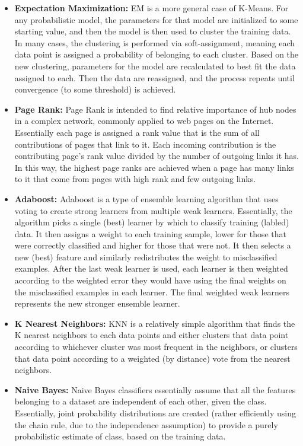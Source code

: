 \documentclass[fleqn,10pt]{SelfArx} %
\begin{document}
\begin{itemize}
	\item{\textbf{Expectation Maximization:}} EM is a more general case of K-Means.  For any probabilistic model, the parameters for that model are initialized to some starting value, and then the model is then used to cluster the training data.  In many cases, the clustering is performed via soft-assignment, meaning each data point is assigned a probability of belonging to each cluster.  Based on the new clustering, parameters for the model are recalculated to best fit the data assigned to each.  Then the data are reassigned, and the process repeats until convergence (to some threshold) is achieved.
	\item{\textbf{Page Rank:}} Page Rank is intended to find relative importance of hub nodes in a complex network, commonly applied to web pages on the Internet.  Essentially each page is assigned a rank value that is the sum of all contributions of pages that link to it.  Each incoming contribution is the contributing page's rank value divided by the number of outgoing links it has.  In this way, the highest page ranks are achieved when a page has many links to it that come from pages with high rank and few outgoing links.
	\item{\textbf{Adaboost:}} Adaboost is a type of ensemble learning algorithm that uses voting to create strong learners from multiple weak learners.  Essentially, the algorithm picks a single (best) learner by which to classify training (labled) data.  It then assigns a weight to each training sample, lower for those that were correctly classified and higher for those that were not.  It then selects a new (best) feature and similarly redistributes the weight to misclassified examples.  After the last weak learner is used, each learner is then weighted according to the weighted error they would have using the final weights on the misclassified examples in each learner.  The final weighted weak learners represents the new stronger ensemble learner.
	\item{\textbf{K Nearest Neighbors:}} KNN is a relatively simple algorithm that finds the K nearest neighbors to each data points and either clusters that data point according to whichever cluster was most frequent in the neighbors, or clusters that data point according to a weighted (by distance) vote from the nearest neighbors.
	\item{\textbf{Naive Bayes:}} Naive Bayes classifiers essentially assume that all the features belonging to a dataset are independent of each other, given the class.  Essentially, joint probability distributions are created (rather efficiently using the chain rule, due to the independence assumption) to provide a purely probabilistic estimate of class, based on the training data.

\end{itemize}
\end{document}
